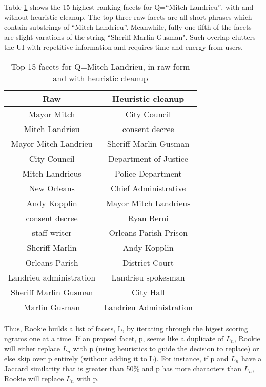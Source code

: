 \documentclass{article}
\begin{document}
Table \ref{t1:one} shows the 15 highest ranking facets for Q=``Mitch Landrieu'', with and without heuristic cleanup. The top three raw facets are all short phrases which contain substrings of ``Mitch Landrieu''. Meanwhile, fully one fifth of the facets are slight varations of the string ``Sheriff Marlin Gusman". Such overlap clutters the UI with repetitive information and requires time and energy from users.

\begin{table}[h!]
\begin{center}
\begin{tabular}{ c c }
 Raw & Heuristic cleanup  \\ 
 \hline
 Mayor Mitch & City Council  \\ 
 Mitch Landrieu & consent decree \\  
 Mayor Mitch Landrieu & Sheriff Marlin Gusman \\
 City Council & Department of Justice \\
 Mitch Landrieus & Police Department \\   
 New Orleans & Chief Administrative \\   
 Andy Kopplin & Mayor Mitch Landrieus \\
 consent decree & Ryan Berni \\    
 staff writer & Orleans Parish Prison \\   
 Sheriff Marlin & Andy Kopplin \\   
 Orleans Parish & District Court \\
 Landrieu administration & Landrieu spokesman \\  
 Sheriff Marlin Gusman & City Hall \\  
 Marlin Gusman & Landrieu Administration \\   

\end{tabular}
\caption{Top 15 facets for Q=Mitch Landrieu, in raw form and with heuristic cleanup}
\end{center}
\label{t1:one}
\end{table}

Thus, Rookie builds a list of facets, L, by iterating through the higest scoring ngrams one at a time. If an propsed facet, p, seems like a duplicate of $L_n$, Rookie will either replace $L_n$ with p (using heuristics to guide the decision to replace) or else skip over p entirely (without adding it to L). For instance, if p and $L_n$ have a Jaccard similarity that is greater than 50\% and p has more characters than $L_n$, Rookie will replace $L_n$ with p.
\end{document}
